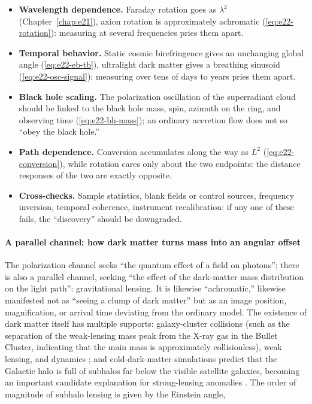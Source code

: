 \begin{itemize}
\item \textbf{Wavelength dependence.} Faraday rotation goes as \(\lambda^2\) (Chapter~\ref{chap:e21}), axion rotation is approximately achromatic (\eqref{eq:e22-rotation}): measuring at several frequencies pries them apart.
\item \textbf{Temporal behavior.} Static cosmic birefringence gives an unchanging global angle (\eqref{eq:e22-eb-tb}), ultralight dark matter gives a breathing sinusoid (\eqref{eq:e22-osc-signal}): measuring over tens of days to years pries them apart.
\item \textbf{Black hole scaling.} The polarization oscillation of the superradiant cloud should be linked to the black hole mass, spin, azimuth on the ring, and observing time (\eqref{eq:e22-bh-mass}); an ordinary accretion flow does not so ``obey the black hole.''
\item \textbf{Path dependence.} Conversion accumulates along the way as \(L^2\) (\eqref{eq:e22-conversion}), while rotation cares only about the two endpoints: the distance responses of the two are exactly opposite.
\item \textbf{Cross-checks.} Sample statistics, blank fields or control sources, frequency inversion, temporal coherence, instrument recalibration: if any one of these fails, the ``discovery'' should be downgraded.
\end{itemize}

\paragraph{A parallel channel: how dark matter turns mass into an angular offset}

The polarization channel seeks ``the quantum effect of a field on photons''; there is also a parallel channel, seeking ``the effect of the dark-matter mass distribution on the light path'': gravitational lensing. It is likewise ``achromatic,'' likewise manifested not as ``seeing a clump of dark matter'' but as an image position, magnification, or arrival time deviating from the ordinary model. The existence of dark matter itself has multiple supports: galaxy-cluster collisions (such as the separation of the weak-lensing mass peak from the X-ray gas in the Bullet Cluster, indicating that the main mass is approximately collisionless), weak lensing, and dynamics \citep{2006ApJ...648L.109C,1993ApJ...404..441K}; and cold-dark-matter simulations predict that the Galactic halo is full of subhalos far below the visible satellite galaxies, becoming an important candidate explanation for strong-lensing anomalies \citep{1994ApJ...427L...1F,1999ApJ...524L..19M,2008Natur.454..735D}. The order of magnitude of subhalo lensing is given by the Einstein angle,

